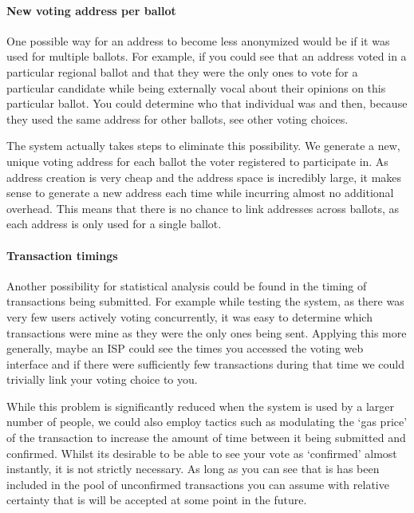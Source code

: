 \documentclass{article}
\begin{document}
	\paragraph{New voting address per ballot}
	\hfill \break \break
	One possible way for an address to become less anonymized would be if it was used for multiple ballots. For example, if you could see that an address voted in a particular regional ballot and that they were the only ones to vote for a particular candidate while being externally vocal about their opinions on this particular ballot. You could determine who that individual was and then, because they used the same address for other ballots, see other voting choices.
	
	The system actually takes steps to eliminate this possibility. We generate a new, unique voting address for each ballot the voter registered to participate in. As address creation is very cheap and the address space is incredibly large, it makes sense to generate a new address each time while incurring almost no additional overhead. This means that there is no chance to link addresses across ballots, as each address is only used for a single ballot.
	
	\clearpage
	\paragraph{Transaction timings}
	\hfill \break \break
	Another possibility for statistical analysis could be found in the timing of transactions being submitted. For example while testing the system, as there was very few users actively voting concurrently, it was easy to determine which transactions were mine as they were the only ones being sent. Applying this more generally, maybe an ISP could see the times you accessed the voting web interface and if there were sufficiently few transactions during that time we could trivially link your voting choice to you.
	
	While this problem is significantly reduced when the system is used by a larger number of people, we could also employ tactics such as modulating the `gas price' of the transaction to increase the amount of time between it being submitted and confirmed. Whilst its desirable to be able to see your vote as `confirmed' almost instantly, it is not strictly necessary. As long as you can see that is has been included in the pool of unconfirmed transactions you can assume with relative certainty that is will be accepted at some point in the future.
    
\end{document}
